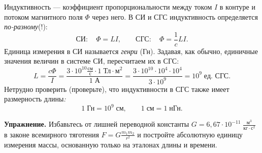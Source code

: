 Индуктивность --- коэффициент пропорциональности между током $I$
в контуре и потоком магнитного поля $\Phi$ через него. В СИ и СГС
индуктивность определяется \emph{по-разному}(!):
\[
\text{СИ}:\quad\Phi=LI,\qquad\text{СГС}:\quad\Phi=\frac{1}{c}LI.
\]
Единица измерения в СИ называется \emph{генри} (Гн). Задавая, как
обычно, единичные значения величин в системе СИ, пересчитаем их в
СГС:
\[
L=\frac{c\Phi}{I}=\frac{3\cdot10^{10}\frac{\text{см}}{\text{с}}\cdot1\;\text{Тл}\cdot\text{м}^{2}}{1\;\text{А}}=\frac{3\cdot10^{10}\cdot10^{4}\cdot10^{4}}{3\cdot10^{9}}=10^{9}\;\text{ед. СГС}.
\]
Нетрудно проверить (проверьте), что индуктивности в СГС также имеет
размерность длины\emph{:
\[
1\;\text{Гн}=10^{9}\;\text{см},\qquad1\;\text{см}=1\;\text{нГн}.
\]
}

\textbf{Упражнение.} Избавьтесь от лишней переводной константы $G=6{,}67\cdot10^{-11}\;\frac{\text{м}^{3}}{\text{кг}\cdot\text{с}^{2}}$
в законе всемирного тяготения $F=G\frac{m_{1}m_{2}}{r^{2}}$ и постройте
абсолютную единицу измерения массы, основанную только на эталонах
длины и времени.


